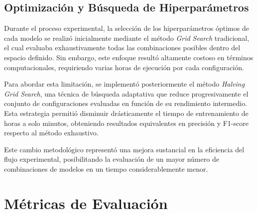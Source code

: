 \documentclass[conference]{IEEEtran}
\begin{document}
\subsection{Optimización y Búsqueda de Hiperparámetros}

Durante el proceso experimental, la selección de los hiperparámetros óptimos de cada modelo se realizó inicialmente mediante el método \textit{Grid Search} tradicional, el cual evaluaba exhaustivamente todas las combinaciones posibles dentro del espacio definido. Sin embargo, este enfoque resultó altamente costoso en términos computacionales, requiriendo varias horas de ejecución por cada configuración.

Para abordar esta limitación, se implementó posteriormente el método \textit{Halving Grid Search}, una técnica de búsqueda adaptativa que reduce progresivamente el conjunto de configuraciones evaluadas en función de su rendimiento intermedio. Esta estrategia permitió disminuir drásticamente el tiempo de entrenamiento de horas a solo minutos, obteniendo resultados equivalentes en precisión y F1-score respecto al método exhaustivo.

Este cambio metodológico representó una mejora sustancial en la eficiencia del flujo experimental, posibilitando la evaluación de un mayor número de combinaciones de modelos en un tiempo considerablemente menor.






\section{Métricas de Evaluación}
\end{document}
